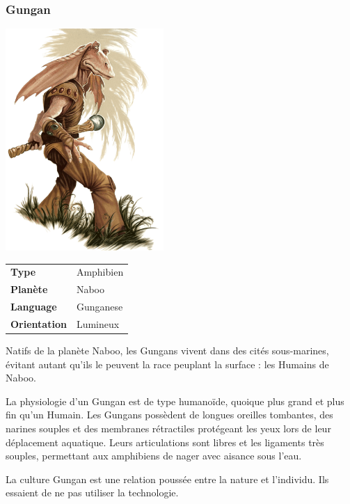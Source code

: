 \subsubsection{Gungan}
\vspace{-1\baselineskip}
\includegraphics[width=6cm]{img/races/gungan.png}
\vspace{-12\baselineskip}

\begin{flushright}
\begin{tabular}{ l l }
	\textbf{Type} 			& Amphibien \\
   	\textbf{Planète} 		& Naboo \\
   	\textbf{Language} 		& Gunganese \\
   	\textbf{Orientation} 	& Lumineux \\
\end{tabular}
\end{flushright}


\vspace{7\baselineskip}

Natifs de la planète Naboo, les Gungans vivent dans des cités sous-marines, évitant autant qu'ils le peuvent la race peuplant la surface : les Humains de Naboo. 

La physiologie d'un Gungan est de type humanoïde, quoique plus grand et plus fin qu'un Humain. Les Gungans possèdent de longues oreilles tombantes, des narines souples et des membranes rétractiles protégeant les yeux lors de leur déplacement aquatique. Leurs articulations sont libres et les ligaments très souples, permettant aux amphibiens de nager avec aisance sous l'eau.

La culture Gungan est une relation poussée entre la nature et l'individu. Ils essaient de ne pas utiliser la technologie.

